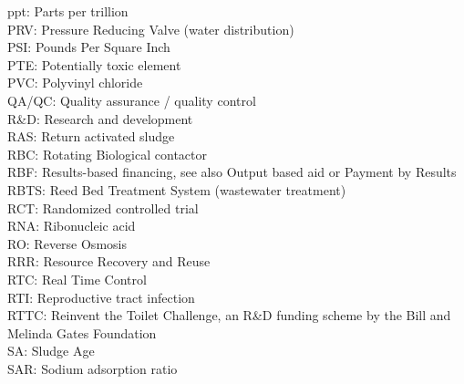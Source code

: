 \documentclass{article}
\begin{document}
ppt:  Parts per trillion
\vspace{0.3cm}\\
PRV:  Pressure Reducing Valve (water distribution)
\vspace{0.3cm}\\
PSI:  Pounds Per Square Inch
\vspace{0.3cm}\\
PTE:  Potentially toxic element
\vspace{0.3cm}\\
PVC:  Polyvinyl chloride
\vspace{0.3cm}\\
QA/QC:  Quality assurance / quality control
\vspace{0.3cm}\\
R\&D:  Research and development
\vspace{0.3cm}\\
RAS:  Return activated sludge
\vspace{0.3cm}\\
RBC: Rotating Biological contactor
\vspace{0.3cm}\\
RBF:  Results-based financing, see also Output based aid or Payment by Results
\vspace{0.3cm}\\
RBTS:  Reed Bed Treatment System (wastewater treatment)
\vspace{0.3cm}\\
RCT:  Randomized controlled trial
\vspace{0.3cm}\\
RNA:  Ribonucleic acid
\vspace{0.3cm}\\
RO:  Reverse Osmosis
\vspace{0.3cm}\\
RRR:  Resource Recovery and Reuse
\vspace{0.3cm}\\
RTC:  Real Time Control
\vspace{0.3cm}\\
RTI:  Reproductive tract infection
\vspace{0.3cm}\\
RTTC:  Reinvent the Toilet Challenge, an R\&D funding scheme by the Bill and Melinda Gates Foundation
\vspace{0.3cm}\\
SA:  Sludge Age
\vspace{0.3cm}\\
SAR:  Sodium adsorption ratio
\end{document}
